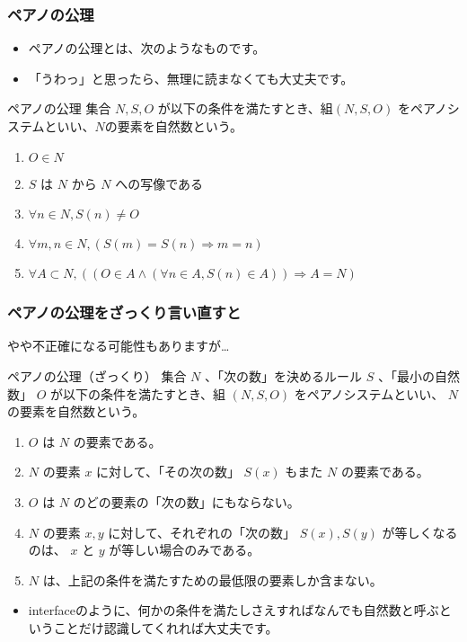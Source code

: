 \documentclass[dvipdfmx]{beamer}
\begin{document}
  \begin{frame}
    \frametitle{ペアノの公理}

    \begin{itemize}
      \item ペアノの公理とは、次のようなものです。
      \item 「うわっ」と思ったら、無理に読まなくても大丈夫です。
    \end{itemize}
    \begin{block}{ペアノの公理}
      集合 $N, S, O$ が以下の条件を満たすとき、組$(N, S, O)$ をペアノシステムといい、$N$の要素を自然数という。
      \begin{enumerate}
        \item $O \in N$
        \item $S$ は $N$ から $N$ への写像である
        \item $\forall n \in N, S(n) \neq O$
        \item $\forall m, n \in N, (S(m) = S(n) \Rightarrow m = n)$
        \item $\forall A \subset N, ((O \in A \land (\forall n \in A, S(n) \in A)) \Rightarrow A = N)$
      \end{enumerate}
    \end{block}

  \end{frame}

  \begin{frame}
    \frametitle{ペアノの公理をざっくり言い直すと}

    やや不正確になる可能性もありますが…
    \begin{block}{ペアノの公理（ざっくり）}
      集合 $N$ 、「次の数」を決めるルール $S$ 、「最小の自然数」 $O$ が以下の条件を満たすとき、組 $(N, S, O)$ をペアノシステムといい、 $N$ の要素を自然数という。
      \begin{enumerate}
        \item $O$ は $N$ の要素である。
        \item $N$ の要素 $x$ に対して、「その次の数」 $S(x)$ もまた $N$ の要素である。
        \item $O$ は $N$ のどの要素の「次の数」にもならない。
        \item $N$ の要素 $x, y$ に対して、それぞれの「次の数」 $S(x), S(y)$ が等しくなるのは、 $x$ と $y$ が等しい場合のみである。
        \item $N$ は、上記の条件を満たすための最低限の要素しか含まない。
      \end{enumerate}
    \end{block}
    \begin{itemize}
      \item interfaceのように、\alert{何かの条件を満たしさえすればなんでも自然数と呼ぶ}ということだけ認識してくれれば大丈夫です。
    \end{itemize}

  \end{frame}
\end{document}
